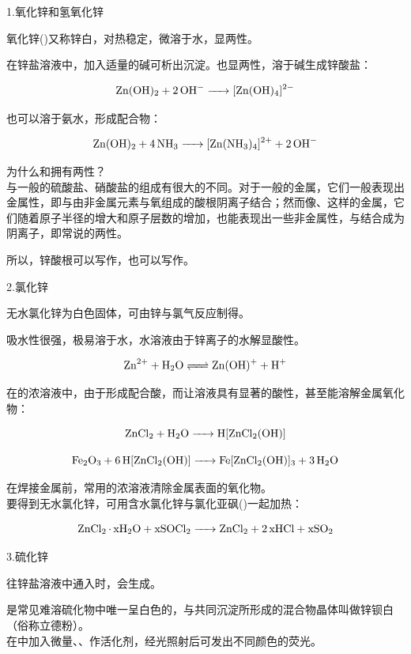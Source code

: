 \documentclass[a4paper,UTF8]{article}
\begin{document}
1.氧化锌和氢氧化锌

氧化锌()又称锌白，对热稳定，微溶于水，显两性。

在锌盐溶液中，加入适量的碱可析出沉淀。也显两性，溶于碱生成锌酸盐：

$$ \ce{Zn(OH)2 + 2OH- -> [Zn(OH)4]^{2-}} $$

也可以溶于氨水，形成配合物：

$$ \ce{Zn(OH)2 + 4NH3 -> [Zn(NH3)4]^{2+} + 2OH-} $$

\begin{tcolorbox}

为什么和拥有两性？\\

与一般的硫酸盐、硝酸盐的组成有很大的不同。对于一般的金属，它们一般表现出金属性，即与由非金属元素与氧组成的酸根阴离子结合；然而像、这样的金属，它们随着原子半径的增大和原子层数的增加，也能表现出一些非金属性，与结合成为阴离子，即常说的两性。

所以，锌酸根可以写作，也可以写作。

\end{tcolorbox}

2.氯化锌

无水氯化锌为白色固体，可由锌与氯气反应制得。

吸水性很强，极易溶于水，水溶液由于锌离子的水解显酸性。

$$ \ce{Zn^{2+} + H2O <=> Zn(OH)+ + H+} $$

在的浓溶液中，由于形成配合酸，而让溶液具有显著的酸性，甚至能溶解金属氧化物：

$$ \ce{ZnCl2 + H2O -> H[ZnCl2(OH)]} $$

$$ \ce{Fe2O3 + 6H[ZnCl2(OH)] -> Fe[ZnCl2(OH)]3 + 3H2O} $$

在焊接金属前，常用的浓溶液清除金属表面的氧化物。\\

要得到无水氯化锌，可用含水氯化锌与氯化亚砜()一起加热：

$$ \ce{ZnCl2 * xH2O + xSOCl2 -> ZnCl2 + 2xHCl + xSO2} $$

3.硫化锌

往锌盐溶液中通入时，会生成。

是常见难溶硫化物中唯一呈白色的，与共同沉淀所形成的混合物晶体叫做锌钡白（俗称立德粉）。\\

在中加入微量、、作活化剂，经光照射后可发出不同颜色的荧光。
\end{document}
